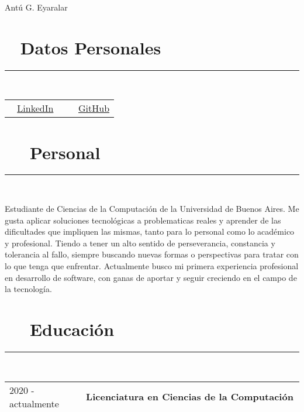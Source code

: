 \documentclass{article}
\begin{document}
\pagestyle{empty}

\par{\centering
		{\huge Antú G. Eyaralar}
	\par}

\section*{\faAt ~ Datos Personales} 
\hrule

\
\newline
\

\begin{tabular}{l | l}
      \faLinkedin ~ \href{https://www.linkedin.com/in/antú-eyaralar-409297221/}{LinkedIn} \
     & \faGithub ~ \href{https://github.com/Agelar01}{GitHub} 
\end{tabular}

\section*{ ~~ Personal} 
\hrule

\
\newline
\



\noindent Estudiante de Ciencias de la Computación de la Universidad de Buenos Aires. 
Me gusta aplicar soluciones tecnológicas a problematicas reales y aprender de las dificultades que impliquen las mismas, tanto para lo personal como lo académico y profesional.
Tiendo a tener un alto sentido de perseverancia, constancia y tolerancia al fallo, siempre buscando nuevas formas o perspectivas para tratar con lo que tenga que enfrentar.
Actualmente busco mi primera experiencia profesional en desarrollo de software, con ganas de aportar y seguir creciendo en el campo de la tecnología.


\section*{\faBook ~~ Educación} 
\hrule

\
\newline
\

\begin{tabular}{l l}
    2020 - actualmente  & \textbf{Licenciatura en Ciencias de la Computación}\\
                    & Facultad de Ciencias Exactas y Naturales, Universidad de Buenos Aires \\ \\
\end{tabular}
\end{document}
